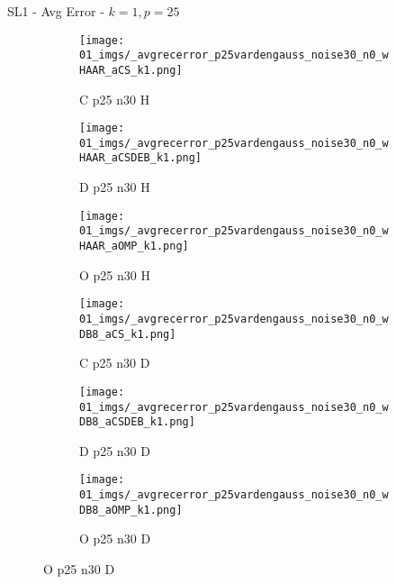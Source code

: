 \begin{frame}{SL1 - Avg Error - $k=1,p=25$}{}
\begin{figure}
\vspace{5pt}

\begin{subfigure}{0.13\textwidth}
\texttt{[image: 01\_imgs/\_avgrecerror\_p25vardengauss\_noise30\_n0\_wHAAR\_aCS\_k1.png]}
\caption*{\tiny C p25 n30 H}
\end{subfigure}
\begin{subfigure}{0.13\textwidth}
\texttt{[image: 01\_imgs/\_avgrecerror\_p25vardengauss\_noise30\_n0\_wHAAR\_aCSDEB\_k1.png]}
\caption*{\tiny D p25 n30 H}
\end{subfigure}
\begin{subfigure}{0.13\textwidth}
\texttt{[image: 01\_imgs/\_avgrecerror\_p25vardengauss\_noise30\_n0\_wHAAR\_aOMP\_k1.png]}
\caption*{\tiny O p25 n30 H}
\end{subfigure}
\begin{subfigure}{0.13\textwidth}
\texttt{[image: 01\_imgs/\_avgrecerror\_p25vardengauss\_noise30\_n0\_wDB8\_aCS\_k1.png]}
\caption*{\tiny C p25 n30 D}
\end{subfigure}
\begin{subfigure}{0.13\textwidth}
\texttt{[image: 01\_imgs/\_avgrecerror\_p25vardengauss\_noise30\_n0\_wDB8\_aCSDEB\_k1.png]}
\caption*{\tiny D p25 n30 D}
\end{subfigure}
\begin{subfigure}{0.13\textwidth}
\texttt{[image: 01\_imgs/\_avgrecerror\_p25vardengauss\_noise30\_n0\_wDB8\_aOMP\_k1.png]}
\caption*{\tiny O p25 n30 D}
\end{subfigure}
\end{figure}
\end{frame}

